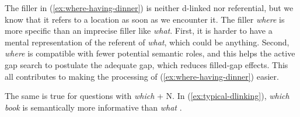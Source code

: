 The filler in (\ref{ex:where-having-dinner}) is neither d-linked nor referential, but we know that it refers to a location as soon as we encounter it. The filler \emph{where} is more specific than an imprecise filler like \emph{what}. First, it is harder to have a mental representation of the referent of \emph{what}, which could be anything. Second, \emph{where} is compatible with fewer potential semantic roles, and this helps the active gap search to postulate the adequate gap, which reduces filled-gap effects. This all contributes to making the processing of (\ref{ex:where-having-dinner}) easier.


The same is true for questions with \emph{which} + N. In (\ref{ex:typical-dlinking}), \emph{which book} is semantically more informative than \emph{what} \citep{Hofmeister.2013,Chaves.2013}.


